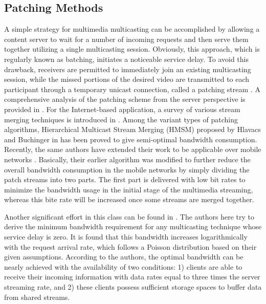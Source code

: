 \subsection{Patching Methods}
A simple strategy for multimedia multicasting can be accomplished by allowing a content server to wait for a number of incoming requests and then serve them together utilizing a single multicasting session. Obviously, this approach, which is regularly known as batching, initiates a noticeable service delay. To avoid this drawback, receivers are permitted to immediately join an existing multicasting session, while the missed portions of the desired video are transmitted to each participant through a temporary unicast connection, called a patching stream \cite{ref16}. A comprehensive analysis of the patching scheme from the server perspective is provided in \cite{ref17}. For the Internet-based application, a survey of various stream merging techniques is introduced in \cite{ref18}. Among the variant types of patching algorithms, Hierarchical Multicast Stream Merging (HMSM) proposed by Hlavacs and Buchinger in \cite{ref19} has been proved to give semi-optimal bandwidth consumption. Recently, the same authors have extended their work to be applicable over mobile networks \cite{ref20}. Basically, their earlier algorithm was modified to further reduce the overall bandwidth consumption in the mobile networks by simply dividing the patch streams into two parts. The first part is delivered with low bit rates to minimize the bandwidth usage in the initial stage of the multimedia streaming, whereas this bite rate will be increased once some streams are merged together.

Another significant effort in this class can be found in \cite{ref21}. The authors here try to derive the minimum bandwidth requirement for any multicasting technique whose service delay is zero. It is found that this bandwidth increases logarithmically with the request arrival rate, which follows a Poisson distribution based on their given assumptions. According to the authors, the optimal bandwidth can be nearly achieved with the availability of two conditions: 1) clients are able to receive their incoming information with data rates equal to three times the server streaming rate, and 2) these clients possess sufficient storage spaces to buffer data from shared streams. 

